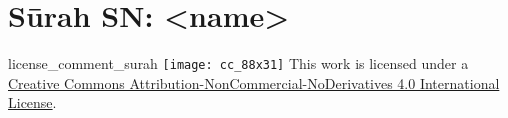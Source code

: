 \begin{comment}
The following strings are to be replaced by a script, in order to use this file as a template:-
* SN = sūrah number, without leading zeros
* SNZ = sūrah number, with leading zeros
\end{comment}
\begin{comment}
The following tags are declared here:-
license_comment_surah
\end{comment}
\section{Sūrah SN: <name>}
\END

\begin{taggedblock}{license_comment_surah}
\texttt{[image: cc\_88x31]}
This work is licensed under a 
\href{http://creativecommons.org/licenses/by-nc-nd/4.0/}{Creative Commons Attribution-NonCommercial-NoDerivatives 4.0 International License}.
\end{taggedblock}